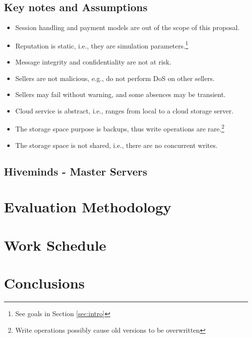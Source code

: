 \documentclass[runningheads]{llncs}
\begin{document}
\subsection{Key notes and Assumptions}
\begin{itemize}
    \item Session handling and payment models are out of the scope of this proposal.
    \item Reputation is static, i.e., they are simulation parameters.\footnote{See goals in Section \ref{sec:intro}}
    \item Message integrity and confidentiality are not at risk.
    \item Sellers are not malicious, e.g., do not perform DoS on other sellers.
    \item Sellers may fail without warning, and some absences may be transient.
    \item Cloud service is abstract, i.e., ranges from local to a cloud storage server.
    \item The storage space purpose is backups, thus write operations are rare.\footnote{Write operations possibly cause old versions to be overwritten}
    \item The storage space is not shared, i.e., there are no concurrent writes.
\end{itemize}

\subsection{Hiveminds - Master Servers}


\newpage\section{Evaluation Methodology}\label{sec:methodology}

\section{Work Schedule}\label{sec:workschedule}

\section{Conclusions}\label{sec:conclusion}



\end{document}
